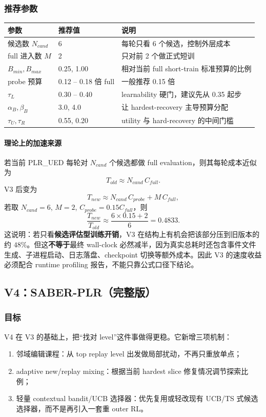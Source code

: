 \documentclass[11pt,a4paper]{ctexart}
\begin{document}
\subsubsection*{推荐参数}
\begin{center}
\begin{tabular}{p{4.0cm}p{3.0cm}p{6.4cm}}
\toprule
参数 & 推荐值 & 说明 \\
\midrule
候选数 \(N_{cand}\) & 6 & 每轮只看 6 个候选，控制外层成本 \\
full 进入数 \(M\) & 2 & 只对前 2 个做正式短训 \\
\(B_{min},B_{max}\) & 0.25, 1.00 & 相对当前 full short-train 标准预算的比例 \\
probe 预算 & 0.12 -- 0.18 倍 full & 一般推荐 0.15 倍 \\
\(\tau_L\) & 0.30 -- 0.40 & learnability 硬门，建议先从 0.35 起步 \\
\(\alpha_B,\beta_B\) & 3.0, 4.0 & 让 hardest-recovery 主导预算分配 \\
\(\tau_U,\tau_R\) & 0.55, 0.20 & utility 与 hard-recovery 的中间门槛 \\
\bottomrule
\end{tabular}
\end{center}

\paragraph{理论上的加速来源}
若当前 PLR\_UED 每轮对 \(N_{cand}\) 个候选都做 full evaluation，则其每轮成本近似为
\[
T_{old}\approx N_{cand}\,C_{full}.
\]
V3 后变为
\[
T_{new}\approx N_{cand}\,C_{probe} + M\,C_{full},
\]
若取 \(N_{cand}=6\), \(M=2\), \(C_{probe}=0.15C_{full}\)，则
\[
\frac{T_{new}}{T_{old}}\approx \frac{6\times0.15+2}{6}=0.4833.
\]
这说明：若只看\textbf{候选评估型训练开销}，V3 在结构上有机会把该部分压到旧版本的约 \(48\%\)。但这\textbf{不等于}最终 wall-clock 必然减半，因为真实总耗时还包含事件文件生成、子进程启动、日志落盘、checkpoint 切换等额外成本。因此 V3 的速度收益必须配合 runtime profiling 报告，不能只靠公式口径下结论。

\subsection{V4：SABER-PLR（完整版）}
\subsubsection*{目标}
V4 在 V3 的基础上，把“找对 level”这件事做得更稳。它新增三项机制：
\begin{enumerate}[leftmargin=2.2em,itemsep=0.25em]
    \item 邻域编辑课程：从 top replay level 出发做局部扰动，不再只重放单点；
    \item adaptive new/replay mixing：根据当前 hardest slice 修复情况调节探索比例；
    \item 轻量 contextual bandit/UCB 选择器：优先复用或轻改现有 UCB/TS 式候选选择器，而不是再引入一套重 outer RL。
\end{enumerate}
\end{document}
